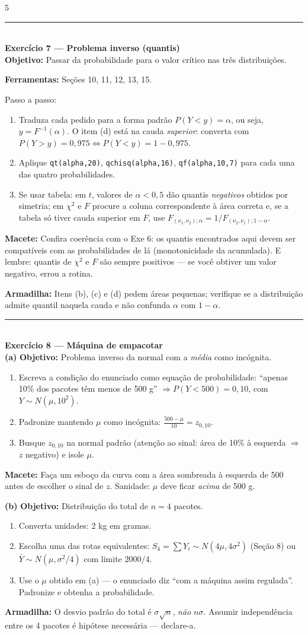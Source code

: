 \documentclass[a4paper,8pt]{extarticle}
\newcommand{\tit}[1]{\vspace{2pt}\textcolor{azul}{\rule{\linewidth}{0.6pt}}\\[1pt]\textbf{\textcolor{azul}{#1}}\\[1pt]}
\newcommand{\mac}[1]{\textcolor{verde}{\textbf{Macete:}} #1\par}
\newcommand{\arm}[1]{\textcolor{vinho}{\textbf{Armadilha:}} #1\par}
\newcommand{\ferr}[1]{\textbf{Ferramentas:} #1\par}
\newcommand{\obj}[1]{\textbf{Objetivo:} #1\par}
\newcommand{\R}[1]{\texttt{\footnotesize #1}}
\begin{document}
\begin{multicols*}{5}
\tit{Exercício 7 — Problema inverso (quantis)}
\obj{Passar da probabilidade para o valor crítico nas três distribuições.}
\ferr{Seções 10, 11, 12, 13, 15.}
Passo a passo:
\begin{enumerate}
\item Traduza cada pedido para a forma padrão $P(Y<y)=\alpha$, ou seja, $y=F^{-1}(\alpha)$. O item (d) está na cauda \emph{superior}: converta com $P(Y>y)=0{,}975\iff P(Y<y)=1-0{,}975$.
\item Aplique \R{qt(alpha,20)}, \R{qchisq(alpha,16)}, \R{qf(alpha,10,7)} para cada uma das quatro probabilidades.
\item Se usar tabela: em $t$, valores de $\alpha<0{,}5$ dão quantis \emph{negativos} obtidos por simetria; em $\chi^2$ e $F$ procure a coluna correspondente à área correta e, se a tabela só tiver cauda superior em $F$, use $F_{(\nu_1,\nu_2);\alpha}=1/F_{(\nu_2,\nu_1);1-\alpha}$.
\end{enumerate}
\mac{Confira coerência com o Exe 6: os quantis encontrados aqui devem ser compatíveis com as probabilidades de lá (monotonicidade da acumulada). E lembre: quantis de $\chi^2$ e $F$ são sempre positivos — se você obtiver um valor negativo, errou a rotina.}
\arm{Itens (b), (c) e (d) pedem áreas pequenas; verifique se a distribuição admite quantil naquela cauda e não confunda $\alpha$ com $1-\alpha$.}

\tit{Exercício 8 — Máquina de empacotar}
\textbf{(a)} \obj{Problema inverso da normal com a \emph{média} como incógnita.}
\begin{enumerate}
\item Escreva a condição do enunciado como equação de probabilidade: “apenas 10\% dos pacotes têm menos de 500 g” $\Rightarrow P(Y<500)=0{,}10$, com $Y\sim N(\mu,10^2)$.
\item Padronize mantendo $\mu$ como incógnita: $\frac{500-\mu}{10}=z_{0{,}10}$.
\item Busque $z_{0{,}10}$ na normal padrão (atenção ao sinal: área de 10\% à esquerda $\Rightarrow$ $z$ negativo) e isole $\mu$.
\end{enumerate}
\mac{Faça um esboço da curva com a área sombreada à esquerda de 500 antes de escolher o sinal de $z$. Sanidade: $\mu$ deve ficar \emph{acima} de 500 g.}
\textbf{(b)} \obj{Distribuição do total de $n=4$ pacotes.}
\begin{enumerate}
\item Converta unidades: 2 kg em gramas.
\item Escolha uma das rotas equivalentes: $S_4=\sum Y_i\sim N(4\mu,4\sigma^2)$ (Seção 8) ou $\bar Y\sim N(\mu,\sigma^2/4)$ com limite $2000/4$.
\item Use o $\mu$ obtido em (a) — o enunciado diz “com a máquina assim regulada”. Padronize e obtenha a probabilidade.
\end{enumerate}
\arm{O desvio padrão do total é $\sigma\sqrt n$, \emph{não} $n\sigma$. Assumir independência entre os 4 pacotes é hipótese necessária — declare-a.}


\end{multicols*}
\end{document}
